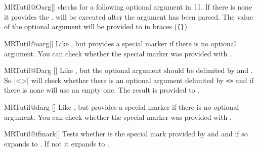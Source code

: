 \begin{describemacro}{MRTutil@Oarg}[]
  checks for a following optional argument in \texttt{[]}. If there is none it
  provides the .  will be executed after the
  argument has been parsed. The value of the optional argument will be provided
  to  in braces (\texttt{\{\}}).
\end{describemacro}

\begin{describemacro}{MRTutil@oarg}[]
  Like , but provides a special marker if there is no optional
  argument. You can check whether the special marker was provided with
  .
\end{describemacro}

\begin{describemacro}{MRTutil@Darg}%
  []
  Like , but the optional argument should be delimited by
   and . So \bverb|\MRTutil@Darg<>{}\foo| will check
  whether there is an optional argument delimited by \texttt{<>} and if there is
  none will use an empty one. The result is provided to .
\end{describemacro}

\begin{describemacro}{MRTutil@darg}%
  []
  Like , but provides a special marker if there is no optional
  argument. You can check whether the special marker was provided with
  . 
\end{describemacro}

\begin{describemacro}{MRTutil@ifmark}[]
  Tests whether  is the special mark provided by 
  and  and if so expands to . If not it expands to
  .
\end{describemacro}

